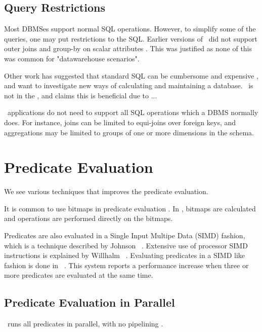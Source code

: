 \subsection{Query Restrictions}
\label{sub:Query Restrictions}
Most DBMSes support normal SQL operations. However, to simplify some of the queries, one may put restrictions to the SQL. Earlier versions of \mssql~did not support outer joins and group-by on scalar attributes \cite{Larson2013-mc}. This was justified as none of this was common for "datawarehouse scenarios".

Other work has suggested that standard SQL can be cumbersome and expensive \cite{Plattner2014-fr}, and want to investigate new ways of calculating and maintaining a database. \qlikview~is not in the , and claims this is beneficial due to ... 

\bd~applications do not need to support all SQL operations which a DBMS normally does. For instance, joins can be limited to equi-joins over foreign keys, and aggregations may be limited to groups of one or more dimensions in the schema.

\section{Predicate Evaluation}
\label{sec:Predicate Evaluation}
We see various techniques that improves the predicate evaluation.

It is common to use bitmaps in predicate evaluation \cite{Raman2008-gi, Raman2013-em}. In \blink, bitmaps are calculated and operations are performed directly on the bitmaps.

Predicates are also evaluated in a Single Input Multipe Data (SIMD) fashion, which is a technique described by Johnson \ea~\cite{Johnson2008-cp}. Extensive use of processor SIMD instructions is explained by Willhalm \ea~\cite{Willhalm2009-hu, Willhalm2013-ri}. Evaluating predicates in a SIMD like fashion is done in \blink~\cite{Raman2008-gi}.  This system reports a performance increase when three or more predicates are evaluated at the same time.

\subsection{Predicate Evaluation in Parallel}
\label{sub:Predicate Evaluation in Parallel}
\blink~runs all predicates in parallel, with no pipelining \cite{Raman2008-gi}.

